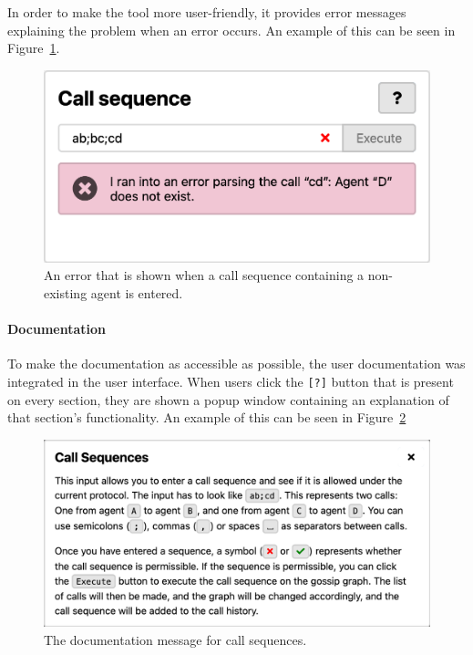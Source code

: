 In order to make the tool more user-friendly, it provides error messages explaining the problem when an error occurs.
An example of this can be seen in Figure~\ref{fig:errors}.

\begin{figure}[htb!]
    \includegraphics[width=\linewidth]{img/errors.png}
    \caption{An error that is shown when a call sequence containing a non-existing agent is entered.}
    \label{fig:errors}
\end{figure}

\paragraph{Documentation}

To make the documentation as accessible as possible, the user documentation was integrated in the user interface.
When users click the \texttt{[?]} button that is present on every section, they are shown a popup window containing an explanation of that section's functionality.
An example of this can be seen in Figure~\ref{fig:documentation}

\begin{figure}[htb!]
    \includegraphics[width=\linewidth]{img/documentation.png}
    \caption{The documentation message for call sequences.}
    \label{fig:documentation}
\end{figure}

